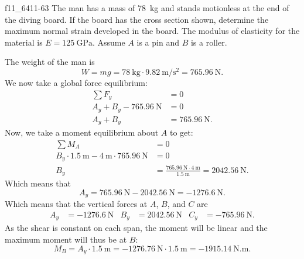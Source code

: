\begin{problemwithimage}{f11_64}{11-63}
  The man has a mass of \qty{78}{\kg} and stands motionless at the end of the diving board.
  If the board has the cross section shown, determine the maximum normal strain developed in the board.
  The modulus of elasticity for the material is $E = \qty{125}{\GPa}$.
  Assume $A$ is a pin and $B$ is a roller. 
\end{problemwithimage}

\begin{derivation}
  The weight of the man is
  \begin{equation*}
    W = mg = \qty{78}{\kg} \cdot \qty{9.82}{\m\per\second\squared}  = \qty{765,96}{\N}
  .\end{equation*}
  We now take a global force equilibrium:
  \begin{align*}
    \sum F_y &= 0 \\
    A_y + B_y - \qty{765.96}{\N} &= 0 \\
    A_y + B_y &= \qty{765.96}{\N} 
  .\end{align*}
  Now, we take a moment equilibrium about $A$ to get:
  \begin{align*}
    \sum M_A &= 0 \\
    B_y \cdot \qty{1.5}{\m} - \qty{4}{\m} \cdot \qty{765.96}{\N} &= 0 \\
    B_y &= \frac{\qty{765.96}{\N} \cdot \qty{4}{\m} }{\qty{1.5}{\m} }  = \qty{2042,56}{\N}
  .\end{align*}
  Which means that
  \begin{equation*}
    A_y = \qty{765.96}{\N} - \qty{2042.56}{\N}   = \qty{-1276,6}{\N}
  .\end{equation*}
  Which means that the vertical forces at $A$, $B$, and $C$ are
  \begin{align*}
    A_y &= \qty{-1276,6}{\N} & B_y &= \qty{2042.56}{\N} & C_y &= \qty{-765.96}{\N} 
  .\end{align*}
  As the shear is constant on each span, the moment will be linear and the maximum moment will thus be at $B$:
  \begin{equation*}
    M_B = A_y \cdot \qty{1.5}{\m} = -\qty{1276.76}{\N} \cdot \qty{1.5}{\m}  = \qty{-1915,14}{\N.\m}
  .\end{equation*}
  

\end{derivation}
